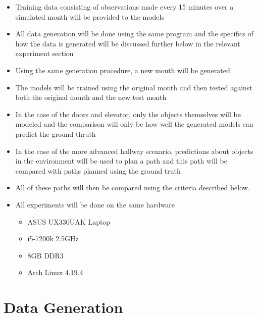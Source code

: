   \begin{itemize}

    \item Training data consisting of observations made every 15 minutes over
          a simulated month will be provided to the models

    \item All data generation will be done using the same program and the
          specifics of how the data is generated will be discussed further
          below in the relevant experiment section

    \item Using the same generation procedure, a new month will be generated

    \item The models will be trained using the original month and then tested
          against both the original month and the new test month

    \item In the case of the doors and elevator, only the objects themselves
          will be modeled and the comparison will only be how well the generated
          models can predict the ground thruth

    \item In the case of the more advanced hallway scenario, predictions about
          objects in the environment will be used to plan a path and this path
          will be compared with paths planned using the ground truth

    \item All of these paths will then be compared using the criteria described
          below.

    \item All experiments will be done on the same hardware
      \begin{itemize}
        \item ASUS UX330UAK Laptop
        \item i5-7200k 2.5GHz
        \item 8GB DDR3
        \item Arch Linux 4.19.4
      \end{itemize}

  \end{itemize}

  \section{ Data Generation }

